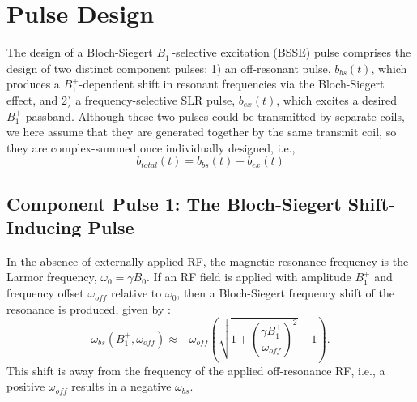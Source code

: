 \documentclass{article}
\newcommand{\bfullt}{b_{total}(t)}
\newcommand{\bext}{b_{ex}(t)}
\newcommand{\bbst}{b_{bs}(t)}
\begin{document}
\section{Pulse Design}
The design of a Bloch-Siegert $B_1^+$-selective excitation (BSSE) pulse comprises the design of two distinct component pulses: 
1) an off-resonant pulse, $\bbst$, which produces a $B_1^+$-dependent shift in resonant frequencies via the Bloch-Siegert effect, 
and 2) a frequency-selective SLR pulse, $\bext$, which excites a desired $B_1^+$ passband.
Although these two pulses could be transmitted by separate coils, 
we here assume that they are generated together by the same transmit coil, 
so they are complex-summed once individually designed, i.e.,
\begin{equation*}
\bfullt = \bbst + \bext
\end{equation*}

\subsection{Component Pulse 1: The Bloch-Siegert Shift-Inducing Pulse} 
In the absence of externally applied RF,
the magnetic resonance frequency is the Larmor frequency, $\omega_0 = \gamma B_0$. 
If an RF field is applied with amplitude $B_1^+$ and frequency offset 
$\omega_{off}$ relative to $\omega_0$, 
then a Bloch-Siegert frequency shift of the resonance is produced, given by \cite{Ramsey1955}:
\begin{equation}
\omega_{bs}(B_1^+, \omega_{off}) \approx -\omega_{off}\left(\sqrt{1+\left(\frac{\gamma B_1^+}{\omega_{off}}\right)^2}-1\right).
\label{eq:bsshift}
\end{equation}
This shift is away from the frequency of the applied off-resonance RF, i.e.,
a positive $\omega_{off}$ results in a negative $\omega_{bs}$.
\end{document}
